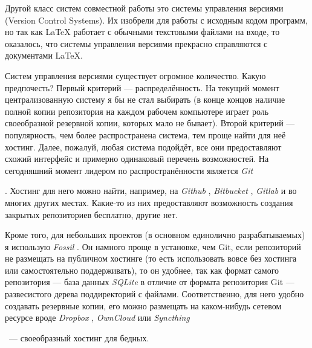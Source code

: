 \documentclass[a4paper,12pt,hyphens]{article}
\newcommand\softname[1]{\textit{#1}}
\begin{document}
Другой класс систем совместной работы это системы управления версиями (Version
Control Systems). Их изобрели для работы с исходным кодом программ, но так как
\LaTeX{} работает с обычными текстовыми файлами на входе, то оказалось, что
системы управления версиями прекрасно справляются с документами \LaTeX{}.

Систем управления версиями существует огромное количество. Какую предпочесть?
Первый критерий --- распределённость. На текущий момент централизованную систему
я бы не стал выбирать (в конце концов наличие полной копии репозитория на каждом
рабочем компьютере играет роль своеобразной резервной копии, которых мало не
бывает). Второй критерий --- популярность, чем более распространена система, тем проще
найти для неё хостинг. Далее, пожалуй, любая система подойдёт, все они предоставляют
схожий интерфейс и примерно одинаковый перечень возможностей. На сегодняшний момент
лидером по распространённости является \softname{Git} \begin{otherlanguage}{english}\parencite{site-git}\end{otherlanguage}.
Хостинг для него можно найти, например, на \softname{Github} \parencite{site-github},
\softname{Bitbucket} \parencite{site-bitbucket}, \softname{Gitlab} \parencite{site-gitlab}
и во многих других местах. Какие-то из них предоставляют возможность создания закрытых
репозиториев бесплатно, другие нет.

Кроме того, для небольших проектов (в основном единолично разрабатываемых) я использую
\softname{Fossil} \parencite{site-fossil}. Он намного проще в установке, чем Git,
если репозиторий не размещать на публичном хостинге (то есть использовать вовсе без
хостинга или самостоятельно поддерживать), то он удобнее, так как формат самого
репозитория --- база данных \softname{SQLite} \parencite{site-sqlite} в отличие от
формата репозитория Git --- развесистого дерева поддиректорий с файлами. Соответственно,
для него удобно создавать резервные копии, его можно размещать на каком-нибудь сетевом
ресурсе вроде \softname{Dropbox} \parencite{site-dropbox},
\softname{OwnCloud} \parencite{site-owncloud} или \softname{Syncthing}
\begin{otherlanguage}{english}\parencite{site-syncthing}\end{otherlanguage}\ --- своеобразный хостинг для бедных.
\end{document}

